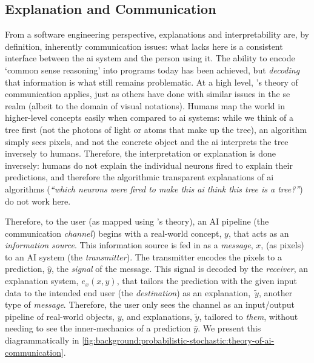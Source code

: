 \subsection{Explanation and Communication}
\label{ssec:background:probabilistic-stochastic:communication}

From a software engineering perspective, explanations and interpretability are, by definition, inherently communication issues: what lacks here is a consistent interface between the \gls{ai} system and the person using it. The ability to encode `common sense reasoning' \citep{McCarthy:1960:PCS:889202} into programs today has been achieved, but \textit{decoding} that information is what still remains problematic. At a high level, \citeauthor{Shannon:1963ti}'s theory of communication \citep{Shannon:1963ti} applies, just as others have done with similar issues in the \gls{se} realm \citep{Moody:2009vo,Wickham:2010hy} (albeit to the domain of visual notations). Humans map the world in higher-level concepts easily when compared to \gls{ai} systems: while we think of a tree first (not the photons of light or atoms that make up the tree), an algorithm simply sees pixels, and not the concrete object \citep{DoshiVelez:2017vm} and the \gls{ai} interprets the tree inversely to humans. Therefore, the interpretation or explanation is done inversely: humans do not explain the individual neurons fired to explain their predictions, and therefore the algorithmic transparent explanations of \gls{ai} algorithms (\textit{``which neurons were fired to make this \gls{ai} think this tree is a tree?''}) do not work here.

Therefore, to the user (as mapped using \citeauthor{Shannon:1963ti}'s theory), an AI pipeline (the communication \textit{channel}) begins with a real-world concept, $y$, that acts as an \textit{information source}. This information source is fed in as a \textit{message}, $x$, (as pixels) to an AI system (the \textit{transmitter}). The transmitter encodes the pixels to a prediction, $\hat{y}$, the \textit{signal} of the message. This signal is decoded by the \textit{receiver}, an explanation system, $e_{x}(x,\hat{y})$, that tailors the prediction with the given input data to the intended end user (the \textit{destination}) as an explanation,~$\tilde{y}$, another type of \textit{message}. Therefore, the user only sees the channel as an input/output pipeline of real-world objects, $y$, and explanations, $\tilde{y}$, tailored to \textit{them}, without needing to see the inner-mechanics of a prediction $\hat{y}$. We present this diagrammatically in \cref{fig:background:probabilistic-stochastic:theory-of-ai-communication}.

